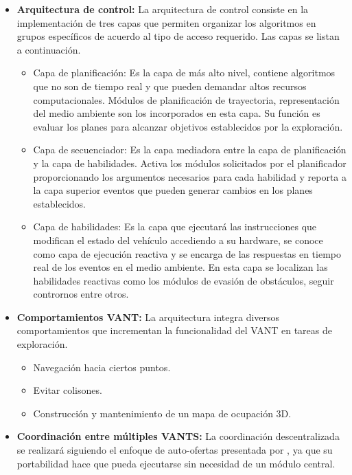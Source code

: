 \begin{itemize}\setlength{\itemsep}{-1mm}
\item \textbf{Arquitectura de control:} La arquitectura de control consiste en la implementación de tres capas que permiten organizar los algoritmos en grupos específicos de acuerdo al tipo de acceso requerido. Las capas se listan a continuación.
  \begin{itemize}\setlength{\itemsep}{-1mm}
  \item Capa de planificación: Es la capa de más alto nivel, contiene algoritmos que no son de tiempo real y que pueden demandar altos recursos computacionales. Módulos de planificación de trayectoria, representación del medio ambiente son los incorporados en esta capa. Su función es evaluar los planes para alcanzar objetivos establecidos por la exploración.
  \item Capa de secuenciador: Es la capa mediadora entre la capa de planificación y la capa de habilidades. Activa los módulos solicitados por el planificador proporcionando los argumentos necesarios para cada habilidad y reporta a la capa superior eventos que pueden generar cambios en los planes establecidos.
  \item Capa de habilidades: Es la capa que ejecutará las instrucciones que modifican el estado del vehículo accediendo a su hardware, se conoce como capa de ejecución reactiva y se encarga de las respuestas en tiempo real de los eventos en el medio ambiente. En esta capa se localizan las habilidades reactivas como los módulos de evasión de obstáculos, seguir contrornos entre otros. 
  \end{itemize}
\item \textbf{Comportamientos VANT:} La arquitectura integra diversos comportamientos que incrementan la funcionalidad del VANT en tareas de exploración.
  \begin{itemize}\setlength{\itemsep}{-1mm}
  \item Navegación hacia ciertos puntos.
  \item Evitar colisones.
  \item Construcción y mantenimiento de un mapa de ocupación 3D.
  \end{itemize}
\item \textbf{Coordinación entre múltiples VANTS:} La coordinación descentralizada se realizará siguiendo el enfoque de auto-ofertas presentada por \citeauthor{CINVESTAM2013}, ya que su portabilidad hace que pueda ejecutarse sin necesidad de un módulo central.
\end{itemize}


